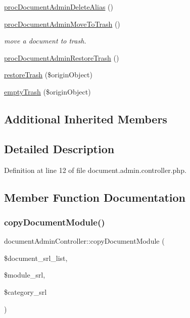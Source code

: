 \begin{DoxyCompactItemize}
\item 
\hyperlink{classdocumentAdminController_ab2f0c552145e0a56841e0aa7e8e03ae7}{proc\+Document\+Admin\+Delete\+Alias} ()
\item 
\hyperlink{classdocumentAdminController_a8dfa5d37621daaba6c66732eb3568730}{proc\+Document\+Admin\+Move\+To\+Trash} ()
\begin{DoxyCompactList}\small\item\em move a document to trash. \end{DoxyCompactList}\item 
\hyperlink{classdocumentAdminController_ac0467d27983d60c51c1128765244a36b}{proc\+Document\+Admin\+Restore\+Trash} ()
\item 
\hyperlink{classdocumentAdminController_a3750ffc8b40a8bbd46f5ac455e65cb37}{restore\+Trash} (\$origin\+Object)
\item 
\hyperlink{classdocumentAdminController_a52981a3af3d6b94661444f65568343ca}{empty\+Trash} (\$origin\+Object)
\end{DoxyCompactItemize}
\subsection*{Additional Inherited Members}


\subsection{Detailed Description}


Definition at line 12 of file document.\+admin.\+controller.\+php.



\subsection{Member Function Documentation}
\mbox{\label{classdocumentAdminController_a9133d1466cbf4baae410f180f8b04e34}} 
\subsubsection{\texorpdfstring{copy\+Document\+Module()}{copyDocumentModule()}}
{\footnotesize\ttfamily document\+Admin\+Controller\+::copy\+Document\+Module (\begin{DoxyParamCaption}\item[{}]{\$document\+\_\+srl\+\_\+list,  }\item[{}]{\$module\+\_\+srl,  }\item[{}]{\$category\+\_\+srl }\end{DoxyParamCaption})}

